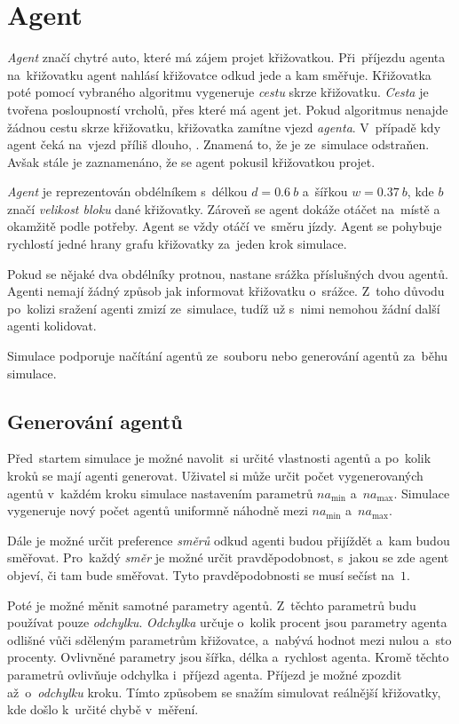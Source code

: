 \section{Agent}\label{sec:agent}

\emph{Agent} značí chytré auto, které má zájem projet křižovatkou.
Při~příjezdu agenta na~křižovatku agent nahlásí křižovatce odkud jede a kam směřuje.
Křižovatka poté pomocí vybraného algoritmu vygeneruje \emph{cestu} skrze křižovatku.
\emph{Cesta} je tvořena posloupností vrcholů, přes které má agent jet.
Pokud algoritmus nenajde žádnou cestu skrze křižovatku, křižovatka zamítne vjezd \emph{agenta}.
V~případě kdy agent čeká na~vjezd příliš dlouho, .
Znamená to, že je ze~simulace odstraňen.
Avšak stále je zaznamenáno, že se agent pokusil křižovatkou projet.

\emph{Agent} je reprezentován obdélníkem s~délkou $d=0.6~b$ a~šířkou $w=0.37~b$,
kde $b$ značí \emph{velikost bloku} dané křižovatky.
Zároveň se agent dokáže otáčet na~místě a okamžitě podle potřeby.
Agent se vždy otáčí ve~směru jízdy.
Agent se pohybuje rychlostí jedné hrany grafu křižovatky za~jeden krok simulace.

Pokud se nějaké dva obdélníky protnou, nastane srážka příslušných dvou agentů.
Agenti nemají žádný způsob jak informovat křižovatku o~srážce.
Z~toho důvodu po~kolizi sražení agenti zmizí ze~simulace, tudíž už s~nimi nemohou žádní další agenti kolidovat.

Simulace podporuje načítání agentů ze~souboru nebo generování agentů za~běhu simulace.

\subsection{Generování agentů}\label{subsec:generovani-agentu}

Před~startem simulace je možné navolit~si určité vlastnosti agentů a po~kolik kroků se mají agenti generovat.
Uživatel si může určit počet vygenerovaných agentů v~každém kroku simulace nastavením parametrů $na_{\min}$ a~$na_{\max}$.
Simulace vygeneruje nový počet agentů uniformně náhodně mezi $na_{\min}$ a~$na_{\max}$.

Dále je možné určit preference \emph{směrů} odkud agenti budou přijíždět a~kam budou směřovat.
Pro~každý \emph{směr} je možné určit pravděpodobnost, s~jakou se zde agent objeví, či tam bude směřovat.
Tyto pravděpodobnosti se musí sečíst na~$1$.

Poté je možné měnit samotné parametry agentů.
Z~těchto parametrů budu používat pouze \emph{odchylku}.
\emph{Odchylka} určuje o~kolik procent jsou parametry agenta odlišné vůči sděleným parametrům křižovatce,
a~nabývá hodnot mezi nulou a~sto procenty.
Ovlivněné parametry jsou šířka, délka a~rychlost agenta.
Kromě těchto parametrů ovlivňuje odchylka i~příjezd agenta.
Příjezd je možné zpozdit až~o~\emph{odchylku} kroku.
Tímto způsobem se snažím simulovat reálnější křižovatky, kde došlo k~určité chybě v~měření.
